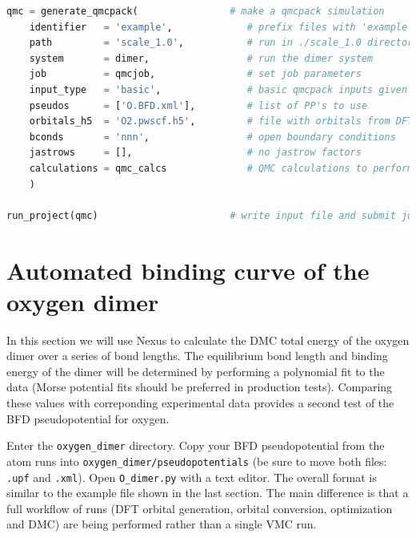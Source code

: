 \begin{lstlisting}[language=Python]
qmc = generate_qmcpack(                # make a qmcpack simulation 
    identifier   = 'example',             # prefix files with 'example'
    path         = 'scale_1.0',           # run in ./scale_1.0 directory
    system       = dimer,                 # run the dimer system
    job          = qmcjob,                # set job parameters
    input_type   = 'basic',               # basic qmcpack inputs given below    
    pseudos      = ['O.BFD.xml'],         # list of PP's to use
    orbitals_h5  = 'O2.pwscf.h5',         # file with orbitals from DFT
    bconds       = 'nnn',                 # open boundary conditions
    jastrows     = [],                    # no jastrow factors
    calculations = qmc_calcs              # QMC calculations to perform
    )
                       
run_project(qmc)                       # write input file and submit job
\end{lstlisting}
\fi





\section{Automated binding curve of the oxygen dimer}
\label{sec:dimer_automation}
In this section we will use Nexus to calculate the DMC total energy of the oxygen dimer over a series of bond lengths.  The equilibrium bond length and binding energy of the dimer will be determined by performing a polynomial fit to the data (Morse potential fits should be preferred in production tests).  Comparing these values with correponding experimental data provides a second test of the BFD pseudopotential for oxygen.

Enter the \texttt{oxygen\_dimer} directory.  Copy your BFD pseudopotential from the atom runs into \texttt{oxygen\_dimer/pseudopotentials} (be sure to move both files: \texttt{.upf} and \texttt{.xml}).  Open \texttt{O\_dimer.py} with a text editor.  The overall format is similar to the example file shown in the last section.  
The main difference is that a full workflow of runs (DFT orbital generation, orbital conversion, optimization and DMC) are being performed rather than a single VMC run.  


